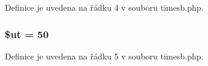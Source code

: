 Definice je uvedena na řádku 4 v souboru timesb.\-php.

\hypertarget{timesb_8php_aadd3f841051043ee58e587e840e8dd0b}{
\subsubsection[{\$ut}]{\setlength{\rightskip}{0pt plus 5cm}\$ut = 50}}\label{timesb_8php_aadd3f841051043ee58e587e840e8dd0b}


Definice je uvedena na řádku 5 v souboru timesb.\-php.

